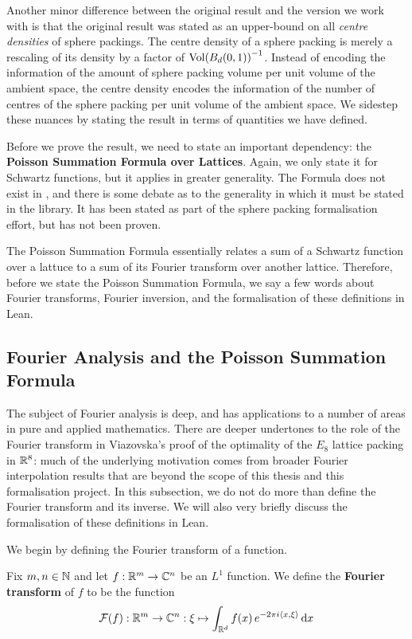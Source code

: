 Another minor difference between the original result and the version we work with is that the original result was stated as an upper-bound on all \textit{centre densities} of sphere packings. The centre density of a sphere packing is merely a rescaling of its density by a factor of $\operatorname{Vol}\!\left( B_d\!\left( 0, 1 \right) \right)^{-1}$. Instead of encoding the information of the amount of sphere packing volume per unit volume of the ambient space, the centre density encodes the information of the number of centres of the sphere packing per unit volume of the ambient space. We sidestep these nuances by stating the result in terms of quantities we have defined.

Before we prove the result, we need to state an important dependency: the \textbf{Poisson Summation Formula over Lattices}. Again, we only state it for Schwartz functions, but it applies in greater generality. The Formula does not exist in \mathlib, and there is some debate as to the generality in which it must be stated in the library. It has been stated as part of the sphere packing formalisation effort, but has not been proven.

The Poisson Summation Formula essentially relates a sum of a Schwartz function over a lattuce to a sum of its Fourier transform over another lattice. Therefore, before we state the Poisson Summation Formula, we say a few words about Fourier transforms, Fourier inversion, and the formalisation of these definitions in Lean.

\subsection{Fourier Analysis and the Poisson Summation Formula}

The subject of Fourier analysis is deep, and has applications to a number of areas in pure and applied mathematics. There are deeper undertones to the role of the Fourier transform in Viazovska's proof of the optimality of the $E_8$ lattice packing in $\mathbb{R}^8$: much of the underlying motivation comes from broader Fourier interpolation results that are beyond the scope of this thesis and this formalisation project. In this subsection, we do not do more than define the Fourier transform and its inverse. We will also very briefly discuss the formalisation of these definitions in Lean.

We begin by defining the Fourier transform of a function.

\begin{boxdefinition}
    Fix $m, n \in \mathbb{N}$ and let $f : \mathbb{R}^m \to \mathbb{C}^n$ be an $L^1$ function. We define the \textbf{Fourier transform} of $f$ to be the function
    \begin{align*}
        \mathcal{F}(f) : \mathbb{R}^m \to \mathbb{C}^n : \xi \mapsto \int_{\mathbb{R}^d} f\!\left( x \right) e^{-2 \pi i \left\langle x, \xi \right\rangle} \operatorname{d}\!x
    \end{align*}
\end{boxdefinition}

